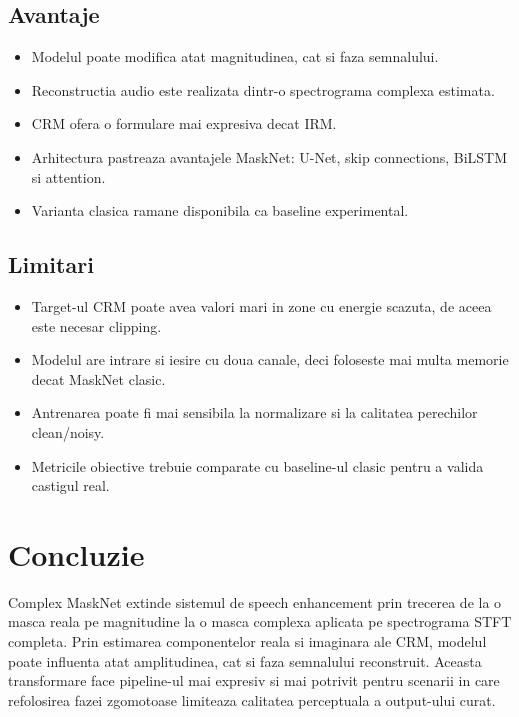 \documentclass[12pt,a4paper]{article}
\begin{document}
\subsection{Avantaje}

\begin{itemize}
    \item Modelul poate modifica atat magnitudinea, cat si faza semnalului.
    \item Reconstructia audio este realizata dintr-o spectrograma complexa estimata.
    \item CRM ofera o formulare mai expresiva decat IRM.
    \item Arhitectura pastreaza avantajele MaskNet: U-Net, skip connections,
    BiLSTM si attention.
    \item Varianta clasica ramane disponibila ca baseline experimental.
\end{itemize}

\subsection{Limitari}

\begin{itemize}
    \item Target-ul CRM poate avea valori mari in zone cu energie scazuta, de aceea
    este necesar clipping.
    \item Modelul are intrare si iesire cu doua canale, deci foloseste mai multa
    memorie decat MaskNet clasic.
    \item Antrenarea poate fi mai sensibila la normalizare si la calitatea perechilor
    clean/noisy.
    \item Metricile obiective trebuie comparate cu baseline-ul clasic pentru a valida
    castigul real.
\end{itemize}

\section{Concluzie}

Complex MaskNet extinde sistemul de speech enhancement prin trecerea de la o masca
reala pe magnitudine la o masca complexa aplicata pe spectrograma STFT completa.
Prin estimarea componentelor reala si imaginara ale CRM, modelul poate influenta
atat amplitudinea, cat si faza semnalului reconstruit. Aceasta transformare face
pipeline-ul mai expresiv si mai potrivit pentru scenarii in care refolosirea fazei
zgomotoase limiteaza calitatea perceptuala a output-ului curat.
\end{document}
